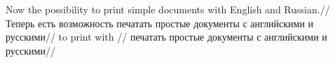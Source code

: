 \documentclass{article}
\begin{document}
\exdisplay
\begingl
\gla Now {} {the possibility} {to print} simple documents with English and Russian.//
\glb Теперь есть возможность печатать простые документы с английскими и 
русскими//
\endgl
\xe
\exdisplay
\begingl
\gla {}  {to print} {} with {}//
 печатать {простые документы} с {английскими и 
русскими}//
\endgl
\end{document}
